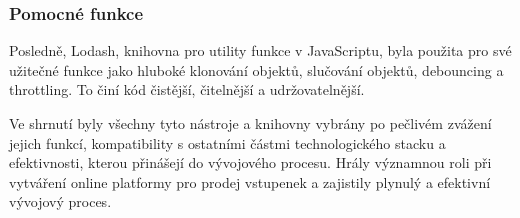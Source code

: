 \subsubsection{Pomocné funkce}
\label{sec:implementace-techologie-ostatni-pomocne-funkce}
Posledně, Lodash, knihovna pro utility funkce v JavaScriptu, byla použita pro své užitečné funkce jako hluboké klonování objektů, slučování objektů, debouncing a throttling.
To činí kód čistější, čitelnější a udržovatelnější.

Ve shrnutí byly všechny tyto nástroje a knihovny vybrány po pečlivém zvážení jejich funkcí, kompatibility s ostatními částmi technologického stacku a efektivnosti, kterou přinášejí do vývojového procesu.
Hrály významnou roli při vytváření online platformy pro prodej vstupenek a zajistily plynulý a efektivní vývojový proces.
